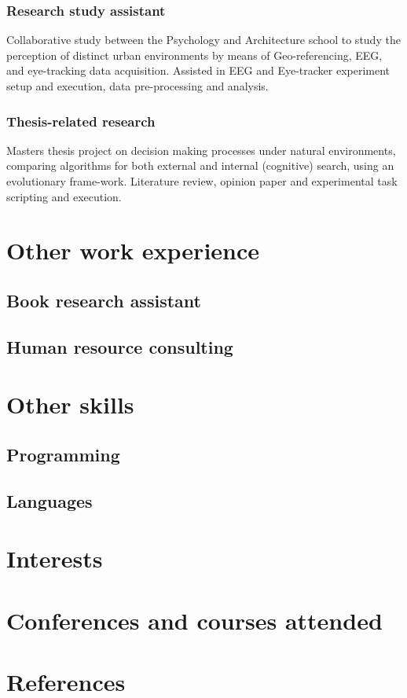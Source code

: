 \documentclass{article}
\begin{document}
\subsubsection{Research study assistant}
Collaborative study between the Psychology and Architecture school to study the perception of distinct urban environments by means of Geo-referencing, EEG, and eye-tracking data acquisition. Assisted in EEG and Eye-tracker experiment setup and execution, data pre-processing and analysis.
\subsubsection{Thesis-related research}
Masters thesis project on decision making processes under natural environments, comparing algorithms for both external and internal (cognitive) search, using an evolutionary frame-work. Literature review, opinion paper and experimental task scripting and execution.

\section{Other work experience}
\blindtext
\subsection{Book research assistant}
\blindtext
\subsection{Human resource consulting}
\blindtext  
\section{Other skills}
\blindtext
\subsection{Programming}
\blindtext
\subsection{Languages}
\blindtext
\section{Interests}
\blindtext
\section{Conferences and courses attended}
\blindtext
\section{References}
\blindtext
\end{document}
